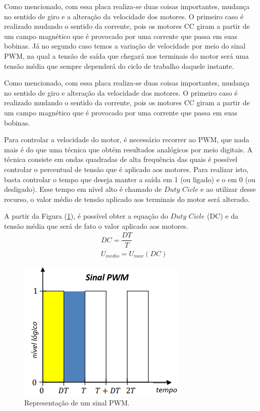 Como mencionado, com essa placa realiza-se duas coisas importantes, mudança no sentido de giro e a alteração da velocidade dos motores. O primeiro caso é realizado mudando o sentido da corrente, pois os motores CC giram a partir de um campo magnético que é provocado por uma corrente que passa em suas bobinas. Já no segundo caso temos a variação de velocidade por meio do sinal PWM, na qual a tensão de saída que chegará nos terminais do motor será uma tensão média que sempre dependerá do ciclo de trabalho daquele instante.

Como mencionado, com essa placa realiza-se duas coisas importantes, mudança no sentido de giro e alteração da velocidade dos motores. O primeiro caso é realizado mudando o sentido da corrente, pois os motores CC giram a partir de um campo magnético que é provocado por uma corrente que passa em suas bobinas.

Para controlar a velocidade do motor, é necessário recorrer ao PWM, que nada mais é do que uma técnica que obtém resultados analógicos por meio digitais. A técnica consiste em ondas quadradas de alta frequência das quais é possível controlar o percentual de tensão que é aplicado aos motores. Para realizar isto, basta controlar o tempo que deseja manter a saída em 1 (ou ligado) e o em 0 (ou desligado). Esse tempo em nível alto é chamado de $\textit{Duty Cicle}$ e ao utilizar desse recurso, o valor médio de tensão aplicado aos terminais do motor será alterado. 

A partir da Figura (\ref{fig:PWM}), é possível obter a equação do $\textit{Duty Cicle}$ (DC) e da tensão média que será de fato o valor aplicado aos motores.
\begin{equation}
    \begin{array}{cc}
         &  DC = \dfrac{DT}{T}\\[20pt]
         &  U_{medio} = U_{max}(DC)
    \end{array}{}
\end{equation}{}

\begin{figure}[!htb]
    \centering
    \includegraphics[scale=1]{Metodologia/PWM}
    \caption{Representação de um sinal PWM.}
    \label{fig:PWM}
\end{figure}

